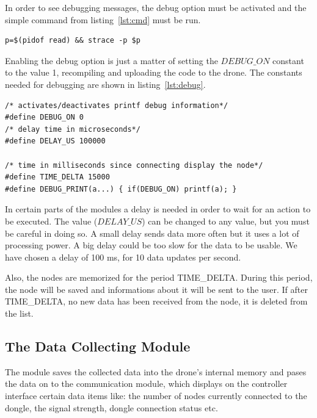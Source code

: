 In order to see debugging messages, the debug option must be activated and the simple command from listing~\ref{lst:cmd} must be run.

\begin{lstlisting}
p=$(pidof read) && strace -p $p
\end{lstlisting}

Enabling the debug option is just a matter of setting the $DEBUG\_ON$ constant to the value 1, recompiling and uploading the code to the drone. The constants needed for debugging are shown in listing~\ref{lst:debug}.

\lstset{numbers=none, mathescape=true, nolol=false,caption=Debug and timing defines,label=lst:debug}
\begin{lstlisting}
/* activates/deactivates printf debug information*/
#define DEBUG_ON 0
/* delay time in microseconds*/
#define DELAY_US 100000

/* time in milliseconds since connecting display the node*/
#define TIME_DELTA 15000
#define DEBUG_PRINT(a...) { if(DEBUG_ON) printf(a); }
\end{lstlisting}

In certain parts of the modules a delay is needed in order to wait for an action to be executed. The value ($DELAY\_US$) can be changed to any value, but you must be careful in doing so. A small delay sends data more often but it uses a lot of processing power. A big delay could be too slow for the data to be usable. We have chosen a delay of 100 ms, for 10 data updates per second.

Also, the nodes are memorized for the period TIME\_DELTA. During this period, the node will be saved and informations about it will be sent to the user. If after TIME\_DELTA, no new data has been received from the node, it is deleted from the list.

\subsection{The Data Collecting Module}

The module saves the collected data into the drone's internal memory and pases the data on to the communication module, which displays on the controller interface certain data items like: the number of nodes currently connected to the dongle, the signal strength, dongle connection status etc.

